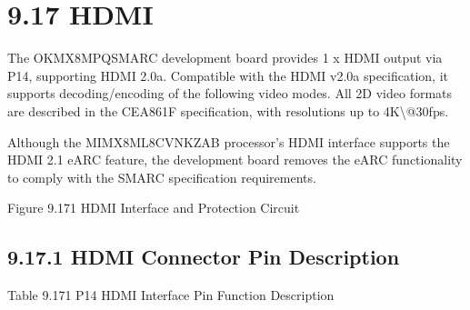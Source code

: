 \documentclass[letterpaper,10pt,openany,english]{sphinxmanual}
\begin{document}
\section{9.17 HDMI}
\label{\detokenize{hardware:id30}}
\sphinxAtStartPar
The OK\sphinxhyphen{}MX8MPQ\sphinxhyphen{}SMARC development board provides 1 x HDMI output via P14, supporting HDMI 2.0a. Compatible with the HDMI v2.0a specification, it supports decoding/encoding of the following video modes. All 2D video formats are described in the CEA\sphinxhyphen{}861\sphinxhyphen{}F specification, with resolutions up to 4K\textbackslash{}@30fps.

\sphinxAtStartPar
Although the MIMX8ML8CVNKZAB processor’s HDMI interface supports the HDMI 2.1 eARC feature, the development board removes the eARC functionality to comply with the SMARC specification requirements.

\sphinxAtStartPar
{}

\sphinxAtStartPar
Figure 9.17\sphinxhyphen{}1 HDMI Interface and Protection Circuit


\subsection{9.17.1 HDMI Connector Pin Description}
\label{\detokenize{hardware:hdmi-connector-pin-description}}
\sphinxAtStartPar
Table 9.17\sphinxhyphen{}1 P14 HDMI Interface Pin Function Description
\end{document}
